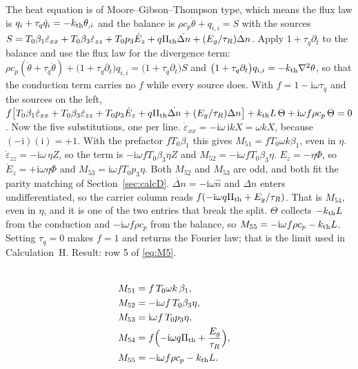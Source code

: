 \documentclass[11pt]{article}
\makeatletter
\newif\ifshowworked
\newenvironment{worked}{%
  \ifshowworked\par\smallskip\noindent\textit{Working.}\par\smallskip\else
  \setbox\z@\vbox\bgroup\fi}{\ifshowworked\par\smallskip\else\egroup\fi}
\newcommand{\ii}{\mathrm{i}}
\makeatother
\begin{document}
\begin{worked}
The heat equation is of Moore--Gibson--Thompson type, which means the flux law is
$q_i+\tau_q\dot q_i=-k_{\rm th}\theta_{,i}$ and the balance is $\rho c_p\dot\theta+q_{i,i}=S$
with the sources $S=T_0\beta_1\dot\varepsilon_{xx}+T_0\beta_3\dot\varepsilon_{zz}
+T_0p_3\dot E_z+q\Pi_{\rm th}\dot{\Delta n}+(E_g/\tau_R)\Delta n$.
Apply $1+\tau_q\partial_t$ to the balance and use the flux law for the divergence term:
$\rho c_p(\dot\theta+\tau_q\ddot\theta)+\bigl(1+\tau_q\partial_t\bigr)q_{i,i}
=\bigl(1+\tau_q\partial_t\bigr)S$ and $\bigl(1+\tau_q\partial_t\bigr)q_{i,i}=-k_{\rm th}\nabla^2\theta$,
so that the conduction term carries no $f$ while every source does. With
$f=1-\ii\omega\tau_q$ and the sources on the left,
$f\bigl[T_0\beta_1\dot\varepsilon_{xx}+T_0\beta_3\dot\varepsilon_{zz}+T_0p_3\dot E_z
+q\Pi_{\rm th}\dot{\Delta n}+(E_g/\tau_R)\Delta n\bigr]
+k_{\rm th}L\,\Theta+\ii\omega f\rho c_p\,\Theta=0$.
Now the five substitutions, one per line.
$\dot\varepsilon_{xx}=-\ii\omega\,\ii kX=\omega kX$, because $(-\ii)(\ii)=+1$. With the prefactor
$fT_0\beta_1$ this gives $M_{51}=fT_0\omega k\beta_1$, even in $\eta$.
$\dot\varepsilon_{zz}=-\ii\omega\,\eta Z$, so the term is $-\ii\omega fT_0\beta_3\eta Z$ and
$M_{52}=-\ii\omega fT_0\beta_3\eta$.
$E_z=-\eta\Phi$, so $\dot E_z=+\ii\omega\eta\Phi$ and $M_{53}=\ii\omega fT_0p_3\eta$. Both
$M_{52}$ and $M_{53}$ are odd, and both fit the parity matching of Section~\ref{sec:calcD}.
$\dot{\Delta n}=-\ii\omega\hat n$ and $\Delta n$ enters undifferentiated, so the carrier column
reads $f(-\ii\omega q\Pi_{\rm th}+E_g/\tau_R)$. That is $M_{54}$, even in $\eta$, and it is one
of the two entries that break the split.
$\Theta$ collects $-k_{\rm th}L$ from the conduction and $-\ii\omega f\rho c_p$ from the balance, so
$M_{55}=-\ii\omega f\rho c_p-k_{\rm th}L$. Setting $\tau_q=0$ makes $f=1$ and returns the Fourier
law; that is the limit used in Calculation~H.
Result: row 5 of \eqref{eq:M5}.
\end{worked}

\begin{align}
\label{eq:M5} \\
M_{51}&=f\,T_0\omega k\,\beta_1, \\
M_{52}&=-\ii\omega f\,T_0\beta_3\eta, \\
M_{53}&=\ii\omega f\,T_0p_3\eta, \\
M_{54}&=f\Bigl(-\ii\omega q\Pi_{\rm th}+\frac{E_g}{\tau_R}\Bigr), \\
M_{55}&=-\ii\omega f\rho c_p-k_{\rm th}L .
\end{align}
\end{document}
